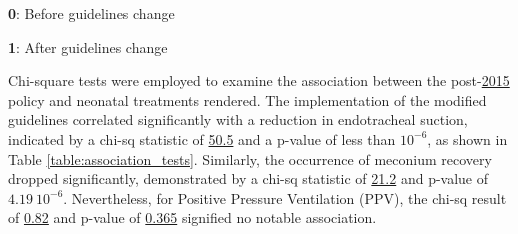 \documentclass[11pt]{article}
\begin{document}
\begin{table}[h]
\caption{\protect\hyperlink{file-table-0-pkl}{Mean and Standard deviation of APGAR scores and SNAPPE II score, stratified by guidelines change}}
\label{table:change_in_policy_impact}
\begin{threeparttable}
\renewcommand{\TPTminimum}{\linewidth}
\begin{tablenotes}
\footnotesize
\item \textbf{0}: Before guidelines change
\item \textbf{1}: After guidelines change
\end{tablenotes}
\end{threeparttable}
\end{table}

Chi-square tests were employed to examine the association between the post-\hyperlink{S0a}{2015} policy and neonatal treatments rendered. The implementation of the modified guidelines correlated significantly with a reduction in endotracheal suction, indicated by a chi-sq statistic of \hyperlink{B1a}{50.5} and a p-value of less than \hyperlink{B1b}{$10^{-6}$}, as shown in Table \ref{table:association_tests}. Similarly, the occurrence of meconium recovery dropped significantly, demonstrated by a chi-sq statistic of \hyperlink{B2a}{21.2} and p-value of \hyperlink{B2b}{$4.19\ 10^{-6}$}. Nevertheless, for Positive Pressure Ventilation (PPV), the chi-sq result of \hyperlink{B0a}{0.82} and p-value of \hyperlink{B0b}{0.365} signified no notable association.
\end{document}
